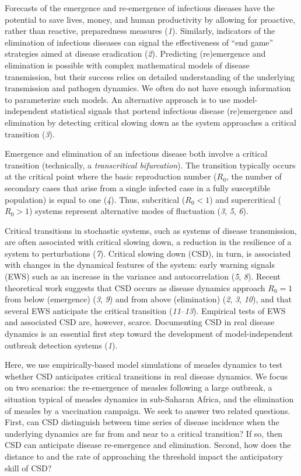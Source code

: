 \documentclass[3p]{elsarticle} %
\begin{document}
Forecasts of the emergence and re-emergence of infectious diseases have
the potential to save lives, money, and human productivity by allowing
for proactive, rather than reactive, preparedness measures (\emph{1}).
Similarly, indicators of the elimination of infectious diseases can
signal the effectiveness of ``end game'' strategies aimed at disease
eradication (\emph{2}). Predicting (re)emergence and elimination is
possible with complex mathematical models of disease transmission, but
their success relies on detailed understanding of the underlying
transmission and pathogen dynamics. We often do not have enough
information to parameterize such models. An alternative approach is to
use model-independent statistical signals that portend infectious
disease (re)emergence and elimination by detecting critical slowing down
as the system approaches a critical transition (\emph{3}).

Emergence and elimination of an infectious disease both involve a
critical transition (technically, a \emph{transcritical bifurcation}).
The transition typically occurs at the critical point where the basic
reproduction number (\(R_0\), the number of secondary cases that arise
from a single infected case in a fully susceptible population) is equal
to one (\emph{4}). Thus, subcritical (\(R_0 < 1\)) and supercritical
(\(R_0 > 1\)) systems represent alternative modes of fluctuation
(\emph{3}, \emph{5}, \emph{6}).

Critical transitions in stochastic systems, such as systems of disease
transmission, are often associated with critical slowing down, a
reduction in the resilience of a system to perturbations (\emph{7}).
Critical slowing down (CSD), in turn, is associated with changes in the
dynamical features of the system: early warning signals (EWS) such as an
increase in the variance and autocorrelation (\emph{5}, \emph{8}).
Recent theoretical work suggests that CSD occurs as disease dynamics
approach \(R_0 = 1\) from below (emergence) (\emph{3}, \emph{9}) and
from above (elimination) (\emph{2}, \emph{3}, \emph{10}), and that
several EWS anticipate the critical transition (\emph{11}--\emph{13}).
Empirical tests of EWS and associated CSD are, however, scarce.
Documenting CSD in real disease dynamics is an essential first step
toward the development of model-independent outbreak detection systems
(\emph{1}).

Here, we use empirically-based model simulations of measles dynamics to
test whether CSD anticipates critical transitions in real disease
dynamics. We focus on two scenarios: the re-emergence of measles
following a large outbreak, a situation typical of measles dynamics in
sub-Saharan Africa, and the elimination of measles by a vaccination
campaign. We seek to answer two related questions. First, can CSD
distinguish between time series of disease incidence when the underlying
dynamics are far from and near to a critical transition? If so, then CSD
can anticipate disease re-emergence and elimination. Second, how does
the distance to and the rate of approaching the threshold impact the
anticipatory skill of CSD?
\end{document}

